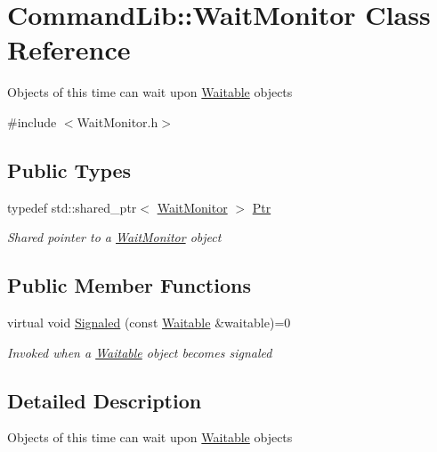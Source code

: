 \hypertarget{class_command_lib_1_1_wait_monitor}{}\section{Command\+Lib\+:\+:Wait\+Monitor Class Reference}
\label{class_command_lib_1_1_wait_monitor}


Objects of this time can wait upon \mbox{\hyperlink{class_command_lib_1_1_waitable}{Waitable}} objects 




{\ttfamily \#include $<$Wait\+Monitor.\+h$>$}

\subsection*{Public Types}
\begin{DoxyCompactItemize}
\item 
typedef std\+::shared\+\_\+ptr$<$ \mbox{\hyperlink{class_command_lib_1_1_wait_monitor}{Wait\+Monitor}} $>$ \mbox{\hyperlink{class_command_lib_1_1_wait_monitor_ae97f385185f20d67f215494278136052}{Ptr}}
\begin{DoxyCompactList}\small\item\em Shared pointer to a \mbox{\hyperlink{class_command_lib_1_1_wait_monitor}{Wait\+Monitor}} object\end{DoxyCompactList}\end{DoxyCompactItemize}
\subsection*{Public Member Functions}
\begin{DoxyCompactItemize}
\item 
virtual void \mbox{\hyperlink{class_command_lib_1_1_wait_monitor_a478cc2d9cc714ecb9b4844e47a67faa1}{Signaled}} (const \mbox{\hyperlink{class_command_lib_1_1_waitable}{Waitable}} \&waitable)=0
\begin{DoxyCompactList}\small\item\em Invoked when a \mbox{\hyperlink{class_command_lib_1_1_waitable}{Waitable}} object becomes signaled\end{DoxyCompactList}\end{DoxyCompactItemize}


\subsection{Detailed Description}
Objects of this time can wait upon \mbox{\hyperlink{class_command_lib_1_1_waitable}{Waitable}} objects

